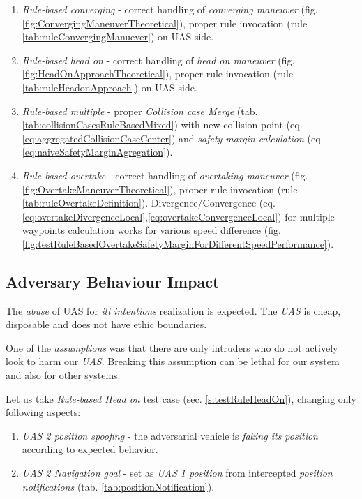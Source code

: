 \begin{enumerate}
    \item \emph{Rule-based converging} - correct handling of \emph{converging maneuver} (fig. \ref{fig:ConvergingManeuverTheoretical}), proper rule invocation (rule \ref{tab:ruleConvergingManuever}) on UAS side.
    
    \item \emph{Rule-based head on} - correct handling of \emph{head on maneuver} (fig. \ref{fig:HeadOnApproachTheoretical}), proper rule invocation (rule \ref{tab:ruleHeadonApproach}) on UAS side. 
    
    \item \emph{Rule-based multiple} - proper \emph{Collision case Merge} (tab. \ref{tab:collisionCasesRuleBasedMixed}) with new collision point (eq. \ref{eq:aggregatedCollisionCaseCenter}) and \emph{safety margin calculation} (eq. \ref{eq:naiveSafetyMarginAgregation}).
    
    \item \emph{Rule-based overtake} - correct handling of \emph{overtaking maneuver} (fig. \ref{fig:OvertakeManeuverTheoretical}), proper rule invocation (rule \ref{tab:ruleOvertakeDefinition}). Divergence/Convergence (eq. \ref{eq:overtakeDivergenceLocal},\ref{eq:overtakeConvergenceLocal}) for multiple waypoints calculation works for various speed difference (fig. \ref{fig:testRuleBasedOvertakeSafetyMarginForDifferentSpeedPerformance}).
\end{enumerate}

\subsection{Adversary Behaviour Impact}\label{s:adversadialBehaviourImpact}

\noindent The \emph{abuse} of UAS for \emph{ill intentions} realization is expected. The \emph{UAS} is cheap, disposable and does not have ethic boundaries. 

One of the \emph{assumptions} was that there are only intruders who do not actively look to harm our \emph{UAS}. Breaking this assumption can be lethal for our system and also for other systems. 

Let us take \emph{Rule-based Head on} test case (sec. \ref{s:testRuleHeadOn}), changing only following aspects:
\begin{enumerate}
	\item \emph{UAS 2 position spoofing} - the adversarial vehicle is \emph{faking its position} according to expected behavior.
	\item \emph{UAS 2 Navigation goal} - set as \emph{UAS 1 position} from intercepted \emph{position notifications} (tab. \ref{tab:positionNotification}).
\end{enumerate}


